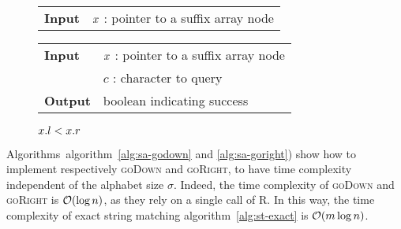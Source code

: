 \begin{figure*}
\begin{minipage}[t]{.5\textwidth}
\begin{algorithm}[H]
\begin{tabular}{ll}
\textbf{Input}  & $x$ : pointer to a suffix array node\\
\end{tabular}
\begin{algorithmic}[1]
\end{algorithmic}
\label{alg:sa-goroot}
\end{algorithm}
\end{minipage}
\hfill
\begin{minipage}[t]{.5\textwidth}
\begin{algorithm}[H]
\begin{tabular}{ll}
\textbf{Input}  & $x$ : pointer to a suffix array node\\
				& $c$ : character to query\\
\textbf{Output} & boolean indicating success\\
\end{tabular}
\begin{algorithmic}[1]
	\State \Return \False
\EndIf
{}
\State \Return $x.l < x.r$
\end{algorithmic}
\label{alg:sa-godownc}
\end{algorithm}
\end{minipage}
\end{figure*}

Algorithms~algorithm~\ref{alg:sa-godown} and \ref{alg:sa-goright}) show how to implement respectively \textsc{goDown} and \textsc{goRight}, to have time complexity independent of the alphabet size $\sigma$.
Indeed, the time complexity of \textsc{goDown} and \textsc{goRight} is $\mathcal{O}(\log{n})$, as they rely on a single call of \textsc{R}.
In this way, the time complexity of exact string matching algorithm~\ref{alg:st-exact} is $\mathcal{O}(m \log{n})$.

